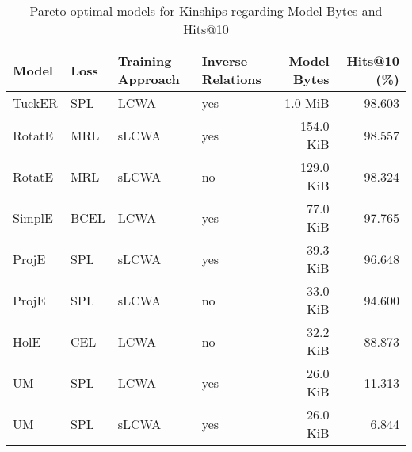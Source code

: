 \begin{table}[H]
\centering
\caption{Pareto-optimal models for Kinships regarding Model Bytes and Hits@10}
\label{tab:skyline_kinships_model_bytes}
\begin{tabular}{llllrr}
\toprule
 Model & Loss & Training Approach & Inverse Relations & Model Bytes &  Hits@10 (\%) \\
\midrule
TuckER &  SPL &              LCWA &               yes &     1.0 MiB &       98.603 \\
RotatE &  MRL &             sLCWA &               yes &   154.0 KiB &       98.557 \\
RotatE &  MRL &             sLCWA &                no &   129.0 KiB &       98.324 \\
SimplE & BCEL &              LCWA &               yes &    77.0 KiB &       97.765 \\
 ProjE &  SPL &             sLCWA &               yes &    39.3 KiB &       96.648 \\
 ProjE &  SPL &             sLCWA &                no &    33.0 KiB &       94.600 \\
  HolE &  CEL &              LCWA &                no &    32.2 KiB &       88.873 \\
    UM &  SPL &              LCWA &               yes &    26.0 KiB &       11.313 \\
    UM &  SPL &             sLCWA &               yes &    26.0 KiB &        6.844 \\
\bottomrule
\end{tabular}
\end{table}

